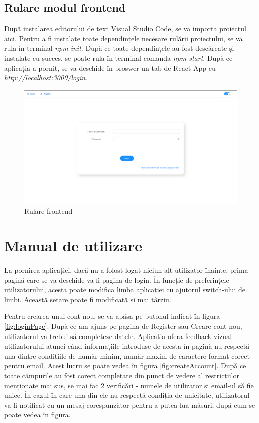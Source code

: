 \subsection{Rulare modul frontend}
După instalarea editorului de text Visual Studio Code, se va importa proiectul aici. Pentru a fi instalate toate dependințele necesare rulării proiectului, 
se va rula în terminal {\it npm init}. 
După ce toate dependințele au fost descărcate și instalate cu succes, se poate rula în terminal comanda {\it npm start}. După ce aplicația a pornit, se va deschide în broswer un tab de React App cu {\it http://localhost:3000/login}.
\begin{figure}[ht]
	\centering
	\includegraphics[width=150mm]{figs/startAppFrontend.png}
    \caption{Rulare frontend}
	\label{fig:startAppFrontend}
\end{figure}

\section{Manual de utilizare}
La pornirea aplicației, dacă nu a folost logat niciun alt utilizator înainte, prima pagină care se va deschide va fi pagina de login.
În funcție de preferințele utilizatorului, acesta poate modifica limba aplicației cu ajutorul switch-ului de limbi. Această setare poate fi modificată și mai târziu.

Pentru crearea unui cont nou, se va apăsa pe butonul indicat în figura \ref{fig:loginPage}. După ce am ajuns pe pagina de Register sau Creare cont nou, utilizatorul va trebui să completeze datele.
Aplicația ofera feedback vizual utilizatorului atunci când informațiile introduse de acesta în pagină nu respectă una dintre condițiile de număr minim, număr maxim de caractere format corect pentru email. Acest lucru se poate vedea în figura \ref{fig:createAccount}.
După ce toate câmpurile au fost corect completate din punct de vedere al restricțiilor menționate mai sus, se mai fac 2 verificări - numele de utilizator și email-ul să fie unice.
În cazul în care una din ele nu respectă condiția de unicitate, utilizatorul va fi notificat cu un mesaj corespunzător pentru a putea lua măsuri, după cum se poate vedea în figura.

